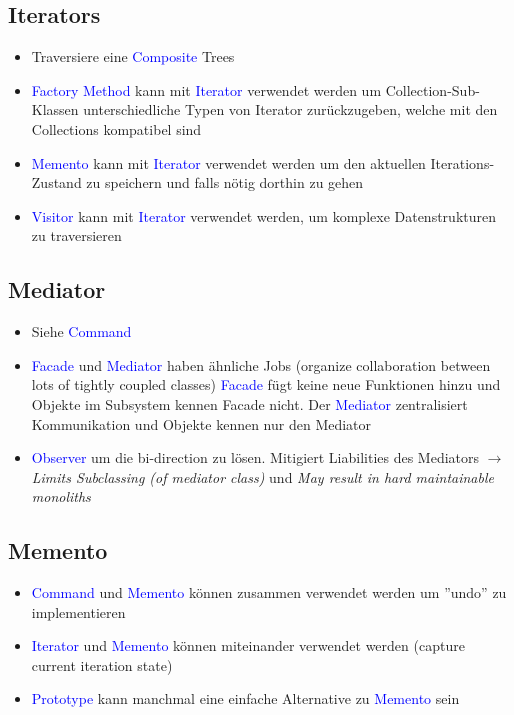 \subsection{Iterators}

\begin{itemize}
    \item Traversiere eine \textcolor{blue}{Composite} Trees
    \item \textcolor{blue}{Factory Method} kann mit \textcolor{blue}{Iterator} verwendet werden um  Collection-Sub-Klassen unterschiedliche Typen von Iterator zurückzugeben, welche mit den Collections kompatibel sind
    \item \textcolor{blue}{Memento} kann mit \textcolor{blue}{Iterator} verwendet werden um den aktuellen Iterations-Zustand zu speichern und falls nötig dorthin zu gehen
    \item \textcolor{blue}{Visitor} kann mit \textcolor{blue}{Iterator} verwendet werden, um komplexe Datenstrukturen zu traversieren
\end{itemize}


\subsection{Mediator}

\begin{itemize}
    \item Siehe \textcolor{blue}{Command}
    \item \textcolor{blue}{Facade} und \textcolor{blue}{Mediator} haben ähnliche Jobs (organize collaboration between lots of tightly coupled classes) \textcolor{blue}{Facade} fügt keine neue Funktionen hinzu und Objekte im Subsystem kennen Facade nicht. Der \textcolor{blue}{Mediator} zentralisiert Kommunikation und Objekte kennen nur den Mediator
    \item \textcolor{blue}{Observer} um die bi-direction zu lösen. Mitigiert Liabilities des Mediators $\rightarrow$ \textit{Limits Subclassing (of mediator class)} und \textit{May result in hard maintainable monoliths}
\end{itemize}

\subsection{Memento}

\begin{itemize}
    \item \textcolor{blue}{Command} und \textcolor{blue}{Memento} können zusammen verwendet werden um ''undo'' zu implementieren
    \item \textcolor{blue}{Iterator} und \textcolor{blue}{Memento} können miteinander verwendet werden (capture current iteration state)
    \item \textcolor{blue}{Prototype} kann manchmal eine einfache Alternative zu \textcolor{blue}{Memento} sein
\end{itemize}

